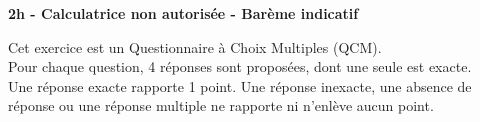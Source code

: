 \documentclass[12pt,a4paper]{article}  %
\begin{document}
\graphicspath{{images/}}

\begin{center}

\end{center}


\begin{center}\textbf{2h - Calculatrice non autorisée - Barème indicatif}\\
\end{center}

%

\vspace*{-0.8cm}

Cet exercice est un Questionnaire à Choix Multiples (QCM).\\
Pour chaque question, 4 réponses sont proposées, dont une seule est exacte.\\
Une réponse exacte rapporte 1 point. Une réponse inexacte, une absence de réponse ou une réponse multiple ne rapporte ni n'enlève aucun point.
\end{document}
